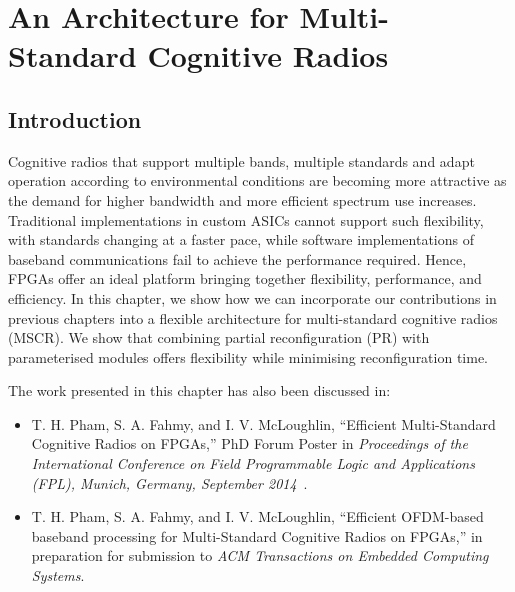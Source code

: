 \chapter{An Architecture for Multi-Standard Cognitive Radios}
\label{chap:MSCR}
\section{Introduction}
Cognitive radios that support multiple bands, multiple standards and adapt operation according to environmental conditions are becoming more attractive as the demand for higher bandwidth and more efficient spectrum use increases.
Traditional implementations in custom ASICs cannot support such flexibility, with standards changing at a faster pace, while software implementations of baseband communications fail to achieve the performance required.
Hence, FPGAs offer an ideal platform bringing together flexibility, performance, and efficiency.
In this chapter, we show how we can incorporate our contributions in previous chapters into a flexible architecture for multi-standard cognitive radios (MSCR).
We show that combining partial reconfiguration (PR) with parameterised  modules offers flexibility while minimising reconfiguration time.

The work presented in this chapter has also been discussed in:
\begin{itemize}
\item T. H. Pham, S. A. Fahmy, and I. V. McLoughlin, ``Efficient Multi-Standard Cognitive Radios on FPGAs,'' PhD Forum Poster in \textit{Proceedings of the International Conference on Field Programmable Logic and Applications (FPL), Munich, Germany, September 2014}~\cite{Pham2014a}.
\item T. H. Pham, S. A. Fahmy, and I. V. McLoughlin, ``Efficient OFDM-based baseband processing for Multi-Standard Cognitive Radios on FPGAs,'' in preparation for submission to \emph{ACM Transactions on Embedded Computing Systems}.
\end{itemize}

